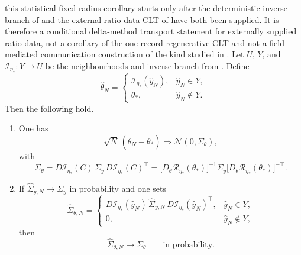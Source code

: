 \begin{corollary}\label{prop:two-mode-delta-main}
\ResponseStandingClause this statistical fixed-radius corollary starts only after
the deterministic inverse branch of  and the external
ratio-data CLT of  have both been supplied. It is
therefore a conditional delta-method transport statement for externally supplied
ratio data, not a corollary of the one-record regenerative CLT and not a
field-mediated communication construction of the kind studied in
\cite{KasprzakTjoa2025Transmission}. Let
$U$, $Y$, and $\mathcal I_{\eta_*}:Y\to U$ be the neighbourhoods and inverse
branch from . Define
\[
\widehat\theta_N=
\begin{cases}
\mathcal I_{\eta_*}(\widehat y_N),& \widehat y_N\in Y,\\
\theta_*,& \widehat y_N\notin Y.
\end{cases}
\]
Then the following hold.
\begin{enumerate}[label=\textup{(\roman*)},leftmargin=2.2em,itemsep=0.25em]
\item One has
\[
\sqrt{N}\,(\widehat\theta_N-\theta_*)
\Longrightarrow
\mathcal N(0,\Sigma_\theta),
\]
with
\begin{equation}\label{eq:delta-covariance-main}
\Sigma_\theta
=D\mathcal I_{\eta_*}(C)\,\Sigma_y\,D\mathcal I_{\eta_*}(C)^\top
=\bigl[D_\theta\mathcal R_{\eta_*}(\theta_*)\bigr]^{-1}
\Sigma_y
\bigl[D_\theta\mathcal R_{\eta_*}(\theta_*)\bigr]^{-{\top}}.
\end{equation}
\item If $\widehat\Sigma_{y,N}\to\Sigma_y$ in probability and one sets
\[
\widehat\Sigma_{\theta,N}=
\begin{cases}
D\mathcal I_{\eta_*}(\widehat y_N)\,
\widehat\Sigma_{y,N}\,
D\mathcal I_{\eta_*}(\widehat y_N)^\top,& \widehat y_N\in Y,\\
0,& \widehat y_N\notin Y,
\end{cases}
\]
then
\[
\widehat\Sigma_{\theta,N}\to\Sigma_\theta
\qquad\text{in probability}.
\]
\end{enumerate}
\end{corollary}

